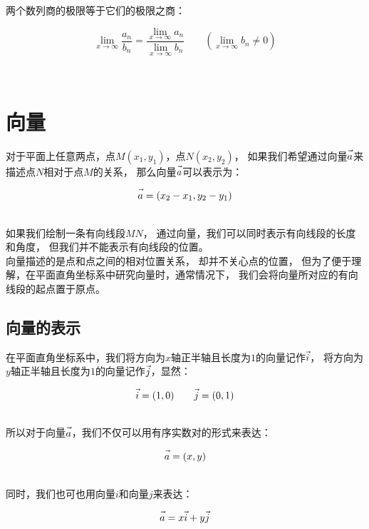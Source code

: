 \documentclass[UTF8]{ctexart}
\let\nvec\vec
\def\vec#1{\nvec{\vphantom b\smash{#1}}}
\begin{document}
    两个数列商的极限等于它们的极限之商：
    \begin{large}
        \begin{equation*}
            \lim_{x\to\infty}\frac{a_{n}}{b_{n}}=\frac{\lim\limits_{x\to\infty}a_{n}}{\lim\limits_{x\to\infty}b_{n}}\qquad\left(\lim_{x\to\infty}b_n\neq 0\right)
        \end{equation*}
    \end{large}\\


\newpage

\section{向量}
    对于平面上任意两点，点$M(x_1,y_1)$，点$N(x_2,y_2)$，
    如果我们希望通过向量$\vec a$来描述点$N$相对于点$M$的关系，
    那么向量$\vec a$可以表示为：
    \begin{large}
    \begin{equation*}
        \vec a=(x_2-x_1,y_2-y_1)
    \end{equation*}
    \end{large}\\
    如果我们绘制一条有向线段$MN$，
    通过向量，我们可以同时表示有向线段的长度和角度，
    但我们并不能表示有向线段的位置。\\[3mm]
    向量描述的是点和点之间的相对位置关系，
    却并不关心点的位置，
    但为了便于理解，在平面直角坐标系中研究向量时，通常情况下，
    我们会将向量所对应的有向线段的起点置于原点。\\

\subsection{向量的表示}
    在平面直角坐标系中，我们将方向为$x$轴正半轴且长度为$1$的向量记作$\vec i$，
    将方向为$y$轴正半轴且长度为$1$的向量记作$\vec j$，显然：
    \begin{large}
    \begin{equation*}
        \vec i=(1,0)\qquad\vec j=(0,1)
    \end{equation*}
    \end{large}\\
    所以对于向量$\vec a$，我们不仅可以用有序实数对的形式来表达：
    \begin{large}
    \begin{equation*}
        \vec a=(x,y)
    \end{equation*}
    \end{large}\\
    同时，我们也可也用向量$i$和向量$j$来表达：
    \begin{large}
    \begin{equation*}
        \vec a=x\vec i+y\vec j
    \end{equation*}
    \end{large}
\end{document}
